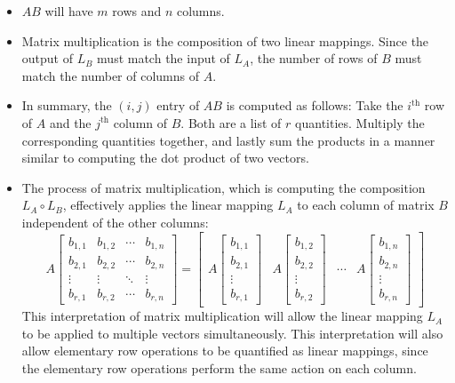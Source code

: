 \documentclass{article}
\begin{document}
\begin{itemize}
\item \(AB\) will have \(m\) rows and \(n\) columns. 
\item Matrix multiplication is the composition of two linear mappings. Since the output of \(L_B\) must match the input of \(L_A\), the number of rows of \(B\) must match the number of columns of \(A\). 
\item In summary, the \((i,j)\) entry of \(AB\) is computed as follows: Take the \(i^\text{th}\) row of \(A\) and the \(j^\text{th}\) column of \(B\). Both are a list of \(r\) quantities. Multiply the corresponding quantities together, and lastly sum the products in a manner similar to computing the dot product of two vectors.  
\item The process of matrix multiplication, which is computing the composition \(L_A \circ L_B\), effectively applies the linear mapping \(L_A\) to each column of matrix \(B\) independent of the other columns:
\[A\begin{bmatrix} 
b_{1,1} & b_{1,2} & \cdots & b_{1,n} \\
b_{2,1} & b_{2,2} & \cdots & b_{2,n} \\
\vdots & \vdots & \ddots & \vdots \\
b_{r,1} & b_{r,2} & \cdots & b_{r,n} 
\end{bmatrix} = \begin{bmatrix}
A\begin{bmatrix} b_{1,1} \\ b_{2,1} \\ \vdots \\ b_{r,1} \end{bmatrix} & 
A\begin{bmatrix} b_{1,2} \\ b_{2,2} \\ \vdots \\ b_{r,2} \end{bmatrix} & 
\cdots & 
A\begin{bmatrix} b_{1,n} \\ b_{2,n} \\ \vdots \\ b_{r,n} \end{bmatrix}
\end{bmatrix}\]
This interpretation of matrix multiplication will allow the linear mapping \(L_A\) to be applied to multiple vectors simultaneously. This interpretation will also allow elementary row operations to be quantified as linear mappings, since the elementary row operations perform the same action on each column.

\end{itemize}
\end{document}
